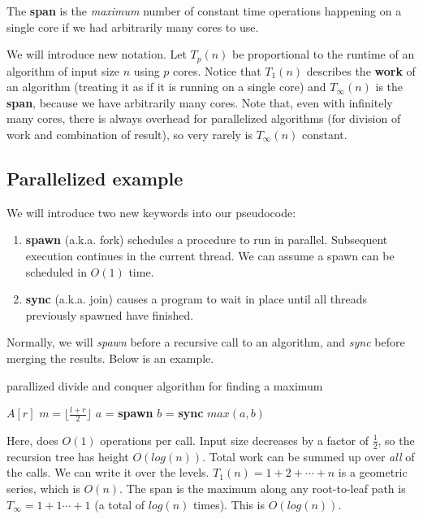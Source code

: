 \documentclass[titlepage, 12pt, leqno]{article}
\begin{document}
\begin{definition}
    The \textbf{span} is the \textit{maximum} number of constant time operations
    happening on a single core if we had arbitrarily many cores to use.
\end{definition}

We will introduce new notation. Let $T_{p}(n)$ be proportional to the runtime
of an algorithm of input size $n$ using $p$ cores. Notice that $T_{1}(n)$
describes the \textbf{work} of an algorithm (treating it as if it is running
on a single core) and $T_{\infty}(n)$ is the \textbf{span}, because we have
arbitrarily many cores. Note that, even with infinitely many cores, there is
always overhead for parallelized algorithms (for division of work and
combination of result), so very rarely is $T_{\infty}(n)$ constant.

\subsection{Parallelized example}
We will introduce two new keywords into our pseudocode:
\begin{enumerate}
    \item \textbf{spawn} (a.k.a. fork) schedules a procedure to run in
        parallel. Subsequent execution continues in the current thread. We can
        assume a spawn can be scheduled in $O(1)$ time.
    \item \textbf{sync} (a.k.a. join) causes a program to wait in place until
        all threads previously spawned have finished.
\end{enumerate}
Normally, we will \textit{spawn} before a recursive call to an algorithm, and
\textit{sync} before merging the results. Below is an example.
\begin{algorithm}
\caption{parallized divide and conquer algorithm for finding a maximum}
\begin{algorithmic}[1]
    \State \Return $A[r]$
    \Else
        \State $m = \lfloor \frac{l+r}{2}\rfloor$
        \State $a$ = 
        \State \textbf{spawn} $b$ = 
        \State \textbf{sync}
        \State \Return $max(a,b)$
    \EndIf
\EndProcedure
\end{algorithmic}
\end{algorithm}

Here,  does $O(1)$ operations per call. Input size decreases by a
factor of $\frac{1}{2}$, so the recursion tree has height $O(log(n))$. Total
work can be summed up over \textit{all} of the calls. We can write it over the
levels. $T_{1}(n) = 1 + 2 + \cdots + n$ is a geometric series, which is $O(n)$.
The span is the maximum along any root-to-leaf path is 
$T_{\infty} = 1 + 1 \cdots + 1$ (a total of $log(n)$ times). This is
$O(log(n))$.
\end{document}
